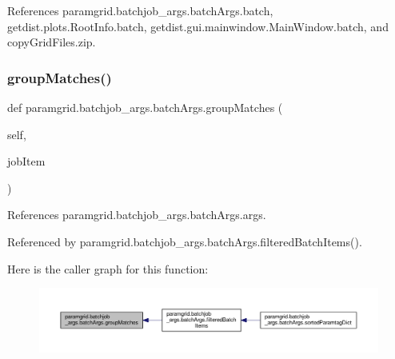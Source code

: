 References paramgrid.\+batchjob\+\_\+args.\+batch\+Args.\+batch, getdist.\+plots.\+Root\+Info.\+batch, getdist.\+gui.\+mainwindow.\+Main\+Window.\+batch, and copy\+Grid\+Files.\+zip.

\mbox{\label{classparamgrid_1_1batchjob__args_1_1batchArgs_ad71f394b5efdfc1226017edd39273606}} 
\subsubsection{\texorpdfstring{group\+Matches()}{groupMatches()}}
{\footnotesize\ttfamily def paramgrid.\+batchjob\+\_\+args.\+batch\+Args.\+group\+Matches (\begin{DoxyParamCaption}\item[{}]{self,  }\item[{}]{job\+Item }\end{DoxyParamCaption})}



References paramgrid.\+batchjob\+\_\+args.\+batch\+Args.\+args.



Referenced by paramgrid.\+batchjob\+\_\+args.\+batch\+Args.\+filtered\+Batch\+Items().

Here is the caller graph for this function\+:
\nopagebreak
\begin{figure}[H]
\begin{center}
\leavevmode
\includegraphics[width=350pt]{classparamgrid_1_1batchjob__args_1_1batchArgs_ad71f394b5efdfc1226017edd39273606_icgraph}
\end{center}
\end{figure}
\mbox{\label{classparamgrid_1_1batchjob__args_1_1batchArgs_ac0e9731c58a0587b3d66dc7e66c64316}} 
